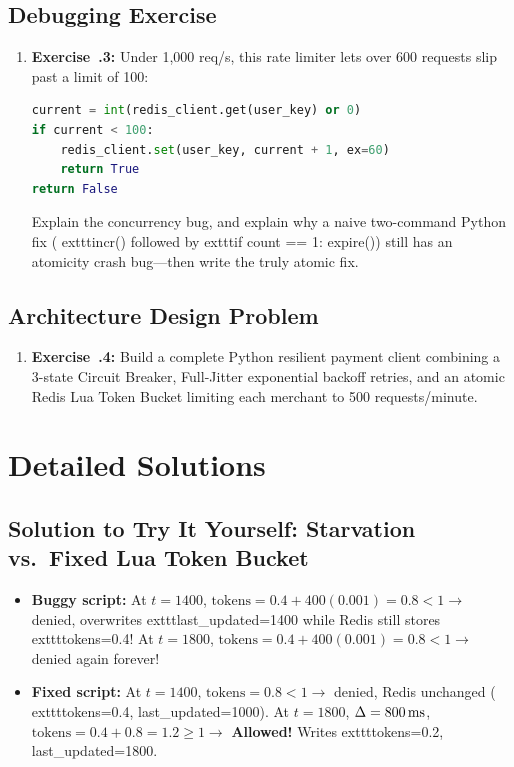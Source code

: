 \subsection{Debugging Exercise}
\begin{enumerate}[leftmargin=15pt]
  \item \textbf{Exercise~\thechapter.3:} Under 1,000 req/s, this rate limiter lets over 600 requests slip past a limit of 100:
\begin{lstlisting}[language=Python]
current = int(redis_client.get(user_key) or 0)
if current < 100:
    redis_client.set(user_key, current + 1, ex=60)
    return True
return False
\end{lstlisting}
  Explain the concurrency bug, and explain why a naive two-command Python fix (	exttt{incr()} followed by 	exttt{if count == 1: expire()}) still has an atomicity crash bug---then write the truly atomic fix.
\end{enumerate}

\subsection{Architecture Design Problem}
\begin{enumerate}[leftmargin=15pt]
  \item \textbf{Exercise~\thechapter.4:} Build a complete Python resilient payment client combining a 3-state Circuit Breaker, Full-Jitter exponential backoff retries, and an atomic Redis Lua Token Bucket limiting each merchant to 500 requests/minute.
\end{enumerate}

\section{Detailed Solutions}

\subsection{Solution to Try It Yourself: Starvation vs.\ Fixed Lua Token Bucket}
\begin{itemize}[leftmargin=15pt]
  \item \textbf{Buggy script:} At $t=1400$, $\text{tokens} = 0.4 + 400(0.001) = 0.8 < 1 \to$ denied, overwrites 	exttt{last\_updated=1400} while Redis still stores 	exttt{tokens=0.4}! At $t=1800$, $\text{tokens} = 0.4 + 400(0.001) = 0.8 < 1 \to$ denied again forever!
  \item \textbf{Fixed script:} At $t=1400$, $\text{tokens} = 0.8 < 1 \to$ denied, Redis unchanged (	exttt{tokens=0.4, last\_updated=1000}). At $t=1800$, $\Delta = 800\text{\,ms}$, $\text{tokens} = 0.4 + 0.8 = 1.2 \ge 1 \to$ \textbf{Allowed!} Writes 	exttt{tokens=0.2, last\_updated=1800}.
\end{itemize}

